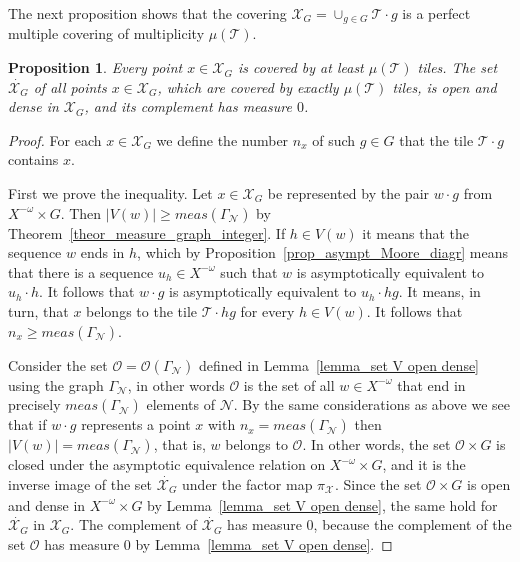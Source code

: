 \documentclass[12pt]{article}
\newcommand{\xmo}{X^{-\omega}}
\newcommand{\limGs}[1][G]{\mathcal{X}_{#1}}
\newcommand{\muG}{\mu}
\newcommand{\mgr}{meas}
\newcommand{\tile}{\mathscr{T}}
\newcommand{\nucl}{\mathcal{N}}
\newcommand{\gr}{\Gamma}
\newtheorem{prop}[theor]{Proposition}
\newtheorem{lemma}{Lemma}
\theoremstyle{definition}
\begin{document}
%
%




The next proposition shows that the covering $\limGs=\cup_{g\in G}\tile\cdot g$ is a perfect
multiple covering of multiplicity $\mu(\tile)$.

\begin{prop}\label{points_above}
Every point $x\in\limGs$ is covered by at least $\mu(\tile)$ tiles. The set $\dot{\limGs}$ of all
points $x\in\limGs$, which are covered by exactly $\mu(\tile)$ tiles, is open and dense in
$\limGs$, and its complement has measure $0$.
\end{prop}
\begin{proof}
For each $x\in\limGs$ we define the number $n_x$ of such $g\in G$ that the tile $\tile\cdot g$
contains $x$.

First we prove the inequality. Let $x\in\limGs$ be represented by the pair $w\cdot g$ from
$\xmo\times G$. Then $|V(w)|\geq\mgr(\gr_\nucl)$ by Theorem~\ref{theor_measure_graph_integer}. If
$h\in V(w)$ it means that the sequence $w$ ends in $h$, which by
Proposition~\ref{prop_asympt_Moore_diagr} means that there is a sequence $u_h\in\xmo$ such that $w$
is asymptotically equivalent to $u_h\cdot h$. It follows that $w\cdot g$ is asymptotically
equivalent to $u_h\cdot hg$. It means, in turn, that $x$ belongs to the tile $\tile\cdot hg$ for
every $h\in V(w)$. It follows that $n_x\geq\mgr(\gr_\nucl)$.

Consider the set $\mathcal{O}=\mathcal{O}(\gr_\nucl)$ defined in Lemma~\ref{lemma_set V open dense}
using the graph $\gr_\nucl$, in other words $\mathcal{O}$ is the set of all $w\in\xmo$ that end in
precisely $\mgr(\gr_\nucl)$ elements of $\nucl$. By the same considerations as above we see that if
$w\cdot g$ represents a point $x$ with $n_x=\mgr(\gr_\nucl)$ then $|V(w)|=\mgr(\gr_\nucl)$, that
is, $w$ belongs to $\mathcal{O}$. In other words, the set $\mathcal{O}\times G$ is closed under the
asymptotic equivalence relation on $\xmo\times G$, and it is the inverse image of the set
$\dot{\limGs}$ under the factor map $\pi_{\limGs[]}$. Since the set $\mathcal{O}\times G$ is open
and dense in $\xmo\times G$ by Lemma~\ref{lemma_set V open dense}, the same hold for $\dot{\limGs}$
in $\limGs$. The complement of $\dot{\limGs}$ has measure $0$, because the complement of the set
$\mathcal{O}$ has measure $0$ by Lemma~\ref{lemma_set V open dense}.
\end{proof}
\end{document}
